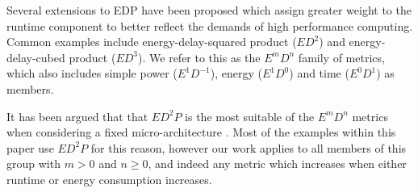 Several extensions to EDP have been proposed which assign greater weight to the runtime component to better reflect the demands of high performance computing.
Common examples include energy-delay-squared product ($ED^{2}$) and energy-delay-cubed product ($ED^{3}$).
We refer to this as the $E^mD^n$ family of metrics, which also includes simple power ($E^1D^{-1}$), energy ($E^1D^0$) and time ($E^0D^1$) as members.

It has been argued that that $ED^{2}P$ is the most suitable of the $E^mD^n$ metrics when considering a fixed micro-architecture \cite{brooks:2000aa}. Most of the examples within this paper use $ED^2P$ for this reason, however our work applies to all members of this group with $m > 0$ and $n \geq 0$, and indeed any metric which increases when either runtime or energy consumption increases.
